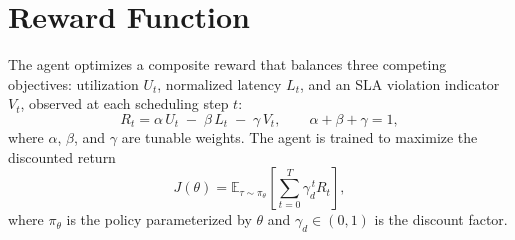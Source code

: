 \section{Reward Function}
The agent optimizes a composite reward that balances three competing
objectives: utilization $U_t$, normalized latency $L_t$, and an SLA
violation indicator $V_t$, observed at each scheduling step $t$:
\begin{equation}
R_t = \alpha \, U_t \;-\; \beta \, L_t \;-\; \gamma \, V_t,
\qquad \alpha + \beta + \gamma = 1,
\label{eq:reward}
\end{equation}
where $\alpha$, $\beta$, and $\gamma$ are tunable weights. The agent is
trained to maximize the discounted return
\begin{equation}
J(\theta) = \mathbb{E}_{\tau \sim \pi_\theta}
\left[ \sum_{t=0}^{T} \gamma_d^{\,t} R_t \right],
\label{eq:objective}
\end{equation}
where $\pi_\theta$ is the policy parameterized by $\theta$ and $\gamma_d \in
(0,1)$ is the discount factor.
